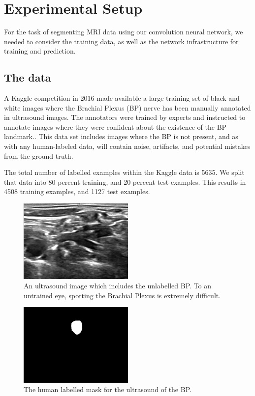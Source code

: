 \documentclass[letterpaper]{article}
\begin{document}
\section{Experimental Setup}
For the task of segmenting MRI data using our convolution neural network, we needed to consider the training data, as well as the network infrastructure for training and prediction.

\subsection{The data}
A Kaggle competition in 2016 \cite{kagglenerve} made available a large training set of black and white images where the Brachial Plexus (BP) nerve has been manually annotated in ultrasound images. The annotators were trained by experts and instructed to annotate images where they were confident about the existence of the BP landmark.. This data set includes images where the BP is not present, and as with any human-labeled data, will contain noise, artifacts, and potential mistakes from the ground truth. 

The total number of labelled examples within the Kaggle data is 5635. We split that data into 80 percent training, and 20 percent test examples. This results in 4508 training examples, and 1127 test examples. 

 \begin{figure}[H]
  \centerline{\includegraphics[width=0.5\textwidth]{Images/1_4.png}}
  \caption{An ultrasound image which includes the unlabelled BP. To an untrained eye, spotting the Brachial Plexus is extremely difficult.}
  \label{fig:BPInUltrasound}
\end{figure}

 \begin{figure}[H]
  \centerline{\includegraphics[width=0.5\textwidth]{Images/1_4_mask.png}}
  \caption{The human labelled mask for the ultrasound of the BP.}
  \label{fig:BPMask}
\end{figure}
\end{document}
